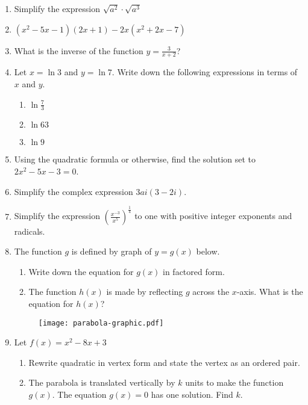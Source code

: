 \documentclass[12pt, oneside]{article}
\begin{document}
\begin{enumerate}
\item Simplify the expression $\sqrt{a^2} \cdot \sqrt{a^3}$

\item $(x^2-5x-1)(2x+1)-2x(x^2+2x-7)$

\item What is the inverse of the function $y=\frac{3}{x+2}$?

\item Let $x=\ln 3$ and $y=\ln 7$. Write down the following expressions in terms of $x$ and $y$.
\begin{enumerate}
    \item $\ln \frac{7}{3}$
    \item $\ln 63$
    \item $\ln 9$
\end{enumerate}

\item Using the quadratic formula or otherwise, find the solution set to $2x^2-5x-3=0$.

\item Simplify the complex expression $3ai(3-2i)$.

\item Simplify the expression $\displaystyle \left( \frac{x^{-3}}{x^5} \right)^{\frac{1}{4}}$ to one with positive integer exponents and radicals.



\newpage
\item The function $g$ is defined by graph of $y=g(x)$ below.
\begin{enumerate}
    \item Write down the equation for $g(x)$ in factored form.
    \item The function $h(x)$ is made by reflecting $g$ across the $x$-axis. What is the equation for $h(x)$?
\end{enumerate}

\begin{figure}[!ht]
    \centering
    \texttt{[image: parabola-graphic.pdf]}
\end{figure}

\item Let $f(x) = x^2-8x+3$
\begin{enumerate}
    \item Rewrite quadratic in vertex form and state the vertex as an ordered pair.
    \item The parabola is translated vertically by $k$ units to make the function $g(x)$. The equation $g(x)=0$ has one solution. Find $k$.
\end{enumerate}


\end{enumerate}
\end{document}
